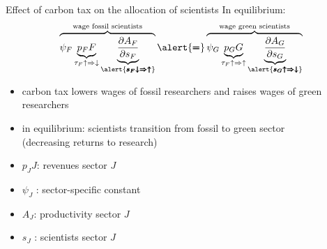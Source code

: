 \documentclass[11pt,aspectratio=169]{beamer}
\begin{document}
\begin{frame}{Effect of carbon tax on the allocation of scientists}
	\vspace{2mm}
	In equilibrium: \large
	\begin{align*}
		\overbrace{{\psi_F} \underbrace{p_F{F}}_{\tau_F\uparrow\Rightarrow\downarrow}\underbrace{\frac{\partial A_{F}}{\partial s_{F}}}_{\alert{\pmb{s_F\downarrow\Rightarrow\uparrow}}}}^{\text{wage fossil scientists}}\alert{\pmb{=}}\overbrace{{\psi_G} \underbrace{p_G{G}}_{\tau_F\uparrow\Rightarrow\uparrow}\underbrace{\frac{\partial A_{G}}{\partial s_{G}}}_{\alert{\pmb{s_G\uparrow\Rightarrow\downarrow}}}}^{\text{wage green scientists}}
	\end{align*}
	\normalsize
	\begin{itemize}
		\item carbon tax lowers wages of fossil researchers and raises wages of green researchers
		\vspace{2mm}
		\item in equilibrium: scientists transition from fossil to green sector\\ \hspace{24mm}\small{(decreasing returns to research)}
	\end{itemize}
	\small
	\vspace{4mm}
	\hspace{-2mm}
	\begin{minipage}[t!]{0.4\textwidth}
		\vspace{0mm}
		\begin{itemize}
			\item[] $p_JJ$: revenues sector $J$
			\vspace{-2mm}
			\item[] $\psi_J$ : sector-specific constant
		\end{itemize}
	\end{minipage}
	\vspace{-5mm}
	\begin{minipage}[t!]{0.5\textwidth}
		\vspace{0mm}
		\begin{itemize}	
			\item[] $A_J$: productivity sector $J$
			\vspace{-2mm}			
			\item[] $s_J$ : scientists sector $J$
		\end{itemize}
	\end{minipage}
\end{frame}
\end{document}
